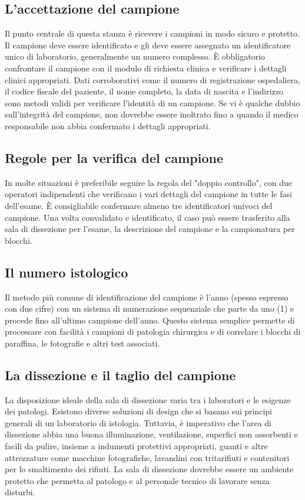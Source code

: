 \subsection{L'accettazione del campione}
Il punto centrale di questa stanza è ricevere i campioni in modo sicuro e protetto. Il campione deve essere identificato e gli deve essere assegnato un identificatore unico di laboratorio, generalmente un numero complesso. È obbligatorio confrontare il campione con il modulo di richiesta clinica e verificare i dettagli clinici appropriati. Dati corroborativi come il numero di registrazione ospedaliera, il codice fiscale del paziente, il nome completo, la data di nascita e l'indirizzo sono metodi validi per verificare l'identità di un campione. Se vi è qualche dubbio sull'integrità del campione, non dovrebbe essere inoltrato fino a quando il medico responsabile non abbia confermato i dettagli appropriati.

\subsection{Regole per la verifica del campione}
In molte situazioni è preferibile seguire la regola del "doppio controllo", con due operatori indipendenti che verificano i vari dettagli del campione in tutte le fasi dell'esame. È consigliabile confermare almeno tre identificatori univoci del campione. Una volta convalidato e identificato, il caso può essere trasferito alla sala di dissezione per l'esame, la descrizione del campione e la campionatura per blocchi.

\subsection{Il numero istologico}
Il metodo più comune di identificazione del campione è l'anno (spesso espresso con due cifre) con un sistema di numerazione sequenziale che parte da uno (1) e procede fino all'ultimo campione dell'anno. Questo sistema semplice permette di processare con facilità i campioni di patologia chirurgica e di correlare i blocchi di paraffina, le fotografie e altri test associati.

\subsection{La dissezione e il taglio del campione}
La disposizione ideale della sala di dissezione varia tra i laboratori e le esigenze dei patologi. Esistono diverse soluzioni di design che si basano sui principi generali di un laboratorio di istologia. Tuttavia, è imperativo che l'area di dissezione abbia una buona illuminazione, ventilazione, superfici non assorbenti e facili da pulire, insieme a indumenti protettivi appropriati, guanti e altre attrezzature come macchine fotografiche, lavandini con tritarifiuti e contenitori per lo smaltimento dei rifiuti. La sala di dissezione dovrebbe essere un ambiente protetto che permetta al patologo e al personale tecnico di lavorare senza disturbi.


